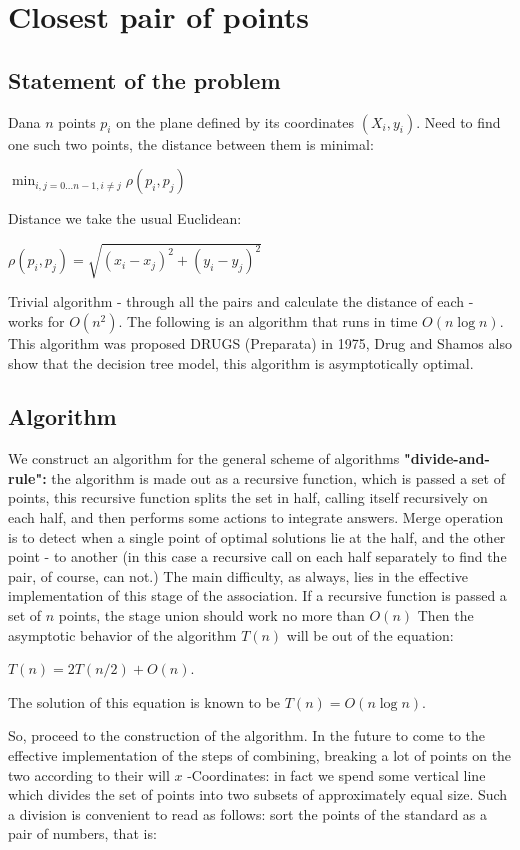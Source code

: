 \section{ Closest pair of points }
\subsection{ Statement of the problem }

Dana $n$ points $p_i$ on the plane defined by its coordinates $(X_i, y_i)$. Need to find one such two points, the distance between them is minimal:

$\min_{i,j=0\dots n-1,i\neq j}\rho(p_{i},p_{j})$

Distance we take the usual Euclidean:

$\rho(p_{i},p_{j})=\sqrt{(x_{i}-x_{j})^{2}+(y_{i}-y_{j})^{2}}$

Trivial algorithm - through all the pairs and calculate the distance of each - works for $O (n ^ 2)$. The following is an algorithm that runs in time $O (n \log n)$. This algorithm was proposed DRUGS (Preparata) in 1975, Drug and Shamos also show that the decision tree model, this algorithm is asymptotically optimal.

\subsection{ Algorithm }

We construct an algorithm for the general scheme of algorithms \textbf{"divide-and-rule":} the algorithm is made ​​out as a recursive function, which is passed a set of points, this recursive function splits the set in half, calling itself recursively on each half, and then performs some actions to integrate answers. Merge operation is to detect when a single point of optimal solutions lie at the half, and the other point - to another (in this case a recursive call on each half separately to find the pair, of course, can not.) The main difficulty, as always, lies in the effective implementation of this stage of the association. If a recursive function is passed a set of $n$ points, the stage union should work no more than $O (n)$ Then the asymptotic behavior of the algorithm $T (n)$ will be out of the equation:

$T (n) = 2 T (n / 2) + O (n).$

The solution of this equation is known to be $T (n) = O (n \log n)$.

So, proceed to the construction of the algorithm. In the future to come to the effective implementation of the steps of combining, breaking a lot of points on the two according to their will $x$ -Coordinates: in fact we spend some vertical line which divides the set of points into two subsets of approximately equal size. Such a division is convenient to read as follows: sort the points of the standard as a pair of numbers, that is:


